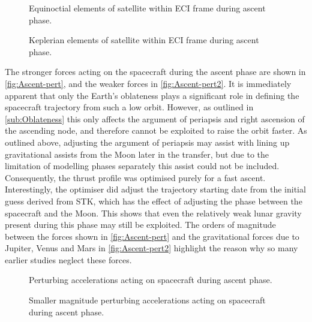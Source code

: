 \begin{figure}
\centering
\def\svgwidth{\figurewidth}

\caption{Equinoctial elements of satellite within ECI frame during ascent phase.} \label{fig:Ascent-mee}
\end{figure}

\begin{figure}
\centering
\def\svgwidth{\figurewidth}

\caption{Keplerian elements of satellite within ECI frame during ascent phase.} \label{fig:Ascent-kep}
\end{figure}

The stronger forces acting on the spacecraft during the ascent phase are shown in \autoref{fig:Ascent-pert}, and the weaker forces in \autoref{fig:Ascent-pert2}. It is immediately apparent that only the Earth's oblateness plays a significant role in defining the spacecraft trajectory from such a low orbit. However, as outlined in \autoref{sub:Oblateness} this only affects the argument of periapsis and right ascension of the ascending node, and therefore cannot be exploited to raise the orbit faster. As outlined above, adjusting the argument of periapsis may assist with lining up gravitational assists from the Moon later in the transfer, but due to the limitation of modelling phases separately this assist could not be included. Consequently, the thrust profile was optimised purely for a fast ascent. Interestingly, the optimiser did adjust the trajectory starting date from the initial guess derived from STK, which has the effect of adjusting the phase between the spacecraft and the Moon. This shows that even the relatively weak lunar gravity present during this phase may still be exploited. The orders of magnitude between the forces shown in \autoref{fig:Ascent-pert} and the gravitational forces due to Jupiter, Venus and Mars in \autoref{fig:Ascent-pert2} highlight the reason why so many earlier studies neglect these forces. 

\begin{subfigures}
\begin{figure}
\centering
\def\svgwidth{\figurewidth}

\caption{Perturbing accelerations acting on spacecraft during ascent phase.} \label{fig:Ascent-pert}
\end{figure}

\begin{figure}
\centering
\def\svgwidth{\figurewidth}

\caption{Smaller magnitude perturbing accelerations acting on spacecraft during ascent phase.} \label{fig:Ascent-pert2}
\end{figure}
\end{subfigures}

